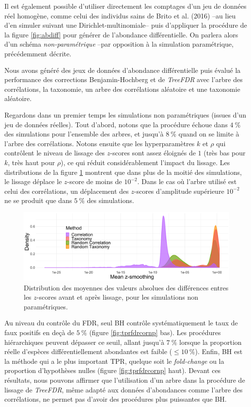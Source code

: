 \documentclass[12pt,a4paper]{reedthesis}
\theoremstyle{definition}
\theoremstyle{definition}
\theoremstyle{definition}
\theoremstyle{remark}
\begin{document}
Il est également possible d'utiliser directement les comptages d'un jeu de données réel homogène, comme celui des individus sains de Brito et al. (2016) --au lieu d'en simuler suivant une Dirichlet-multinomiale-- puis d'appliquer la procédure de la figure \ref{fig:abdiff} pour générer de l'abondance différentielle. On parlera alors d'un schéma \emph{non-paramétrique} --par opposition à la simulation paramétrique, précédemment décrite.

Nous avons généré des jeux de données d'abondance différentielle puis évalué la performance des corrections Benjamin-Hochberg et de \emph{TreeFDR} avec l'arbre des corrélations, la taxonomie, un arbre des corrélations aléatoire et une taxonomie aléatoire.

Regardons dans un premier temps les simulations non paramétriques (issues d'un jeu de données réelles). Tout d'abord, notons que la procédure échoue dans \(4~\%\) des simulations pour l'ensemble des arbres, et jusqu'à \(8~\%\) quand on se limite à l'arbre des corrélations. Notons ensuite que les hyperparamètres \(k\) et \(\rho\) qui contrôlent le niveau de lissage des \(z\)-scores sont assez éloignés de \(1\) (très bas pour \(k\), très haut pour \(\rho\)), ce qui réduit considérablement l'impact du lissage. Les distributions de la figure \ref{fig:smoothing} montrent que dans plus de la moitié des simulations, le lissage déplace le \(z\)-score de moins de \(10^{-2}\). Dans le cas où l'arbre utilisé est celui des corrélations, un déplacement des \(z\)-scores d'amplitude supérieure \(10^{-2}\) ne se produit que dans \(5~\%\) des simulations.


\begin{figure}

{\centering \includegraphics[width=0.9\linewidth]{img/smoothing} 

}

\caption{Distribution des moyennes des valeurs absolues des différences entres les \(z\)-scores avant et après lissage, pour les simulations non paramétriques.}\label{fig:smoothing}
\end{figure}
Au niveau du contrôle du FDR, seul BH contrôle systématiquement le taux de faux positifs en deçà de \(5~\%\) (figure \ref{fig:tprfdrcornp} bas). Les procédures hiérarchiques peuvent dépasser ce seuil, allant jusqu'à \(7~\%\) lorsque la proportion réelle d'espèces différentiellement abondantes est faible (\(\leq 10~\%\)). Enfin, BH est la méthode qui a le plus important TPR, quelque soit le \emph{fold-change} ou la proportion d'hypothèses nulles (figure \ref{fig:tprfdrcornp} haut). Devant ces résultats, nous pouvons affirmer que l'utilisation d'un arbre dans la procédure de lissage de \emph{TreeFDR}, même adapté aux données d'abondances comme l'arbre des corrélations, ne permet pas d'avoir des procédures plus puissantes que BH.
\end{document}
